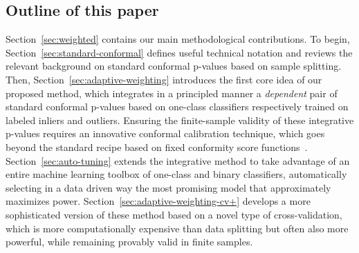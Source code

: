 \documentclass[11pt]{article}
\begin{document}
\subsection{Outline of this paper}


Section~\ref{sec:weighted} contains our main methodological contributions. To begin, Section~\ref{sec:standard-conformal} defines useful technical notation and reviews the relevant background on standard conformal p-values based on sample splitting.
Then, Section~\ref{sec:adaptive-weighting} introduces the first core idea of our proposed method, which integrates in a principled manner a {\em dependent} pair of standard conformal p-values based on one-class classifiers respectively trained on labeled inliers and outliers.
Ensuring the finite-sample validity of these integrative p-values requires an innovative conformal calibration technique, which goes beyond the standard recipe based on fixed conformity score functions~\cite{vovk2005algorithmic,bates2021testing}.
Section~\ref{sec:auto-tuning} extends the integrative method to take advantage of an entire machine learning toolbox of one-class and binary classifiers, automatically selecting in a data driven way the most promising model that approximately maximizes power. 
Section~\ref{sec:adaptive-weighting-cv+} develops a more sophisticated version of these method based on a novel type of cross-validation, which is more computationally expensive than data splitting but often also more powerful, while remaining provably valid in finite samples.
\end{document}

